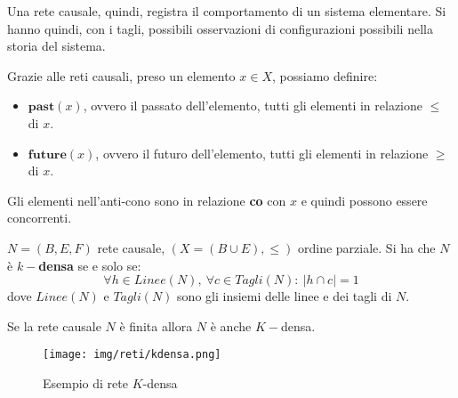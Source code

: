 Una rete causale, quindi, registra il comportamento di un sistema elementare. Si
hanno quindi, con i tagli, possibili osservazioni di configurazioni possibili
nella storia del sistema.
\begin{definizione}
    Grazie alle reti causali, preso un elemento $x \in X$, possiamo definire:
    \begin{itemize}
        \item $\textbf{past}(x)$, ovvero il passato dell'elemento, tutti gli
              elementi in relazione $\leq$ di $x$.
        \item $\textbf{future}(x)$, ovvero il futuro dell'elemento, tutti gli
              elementi in relazione $\geq$ di $x$.
    \end{itemize}
    Gli elementi nell'anti-cono sono in relazione \textbf{co} con $x$ e quindi
    possono essere concorrenti.
\end{definizione}
\begin{definizione}
    $N = (B, E, F)$ rete causale, $(X = (B \cup E), \leq)$ ordine parziale. Si
    ha che $N$ è \textbf{$k-$densa} se e solo se:
    \begin{equation}
        \forall h \in Linee(N), \ \forall c \in Tagli(N): \ |h \cap c| = 1
    \end{equation}
    dove $Linee(N)$ e $Tagli(N)$ sono gli insiemi delle linee e dei tagli di $N$.
\end{definizione}
\begin{nota}
    Se la rete causale $N$ è finita allora $N$ è anche $K-$densa.
\end{nota}
\begin{figure}[!ht]
    \centering
    \texttt{[image: img/reti/kdensa.png]}
    \caption{Esempio di rete $K$-densa}
\end{figure}
